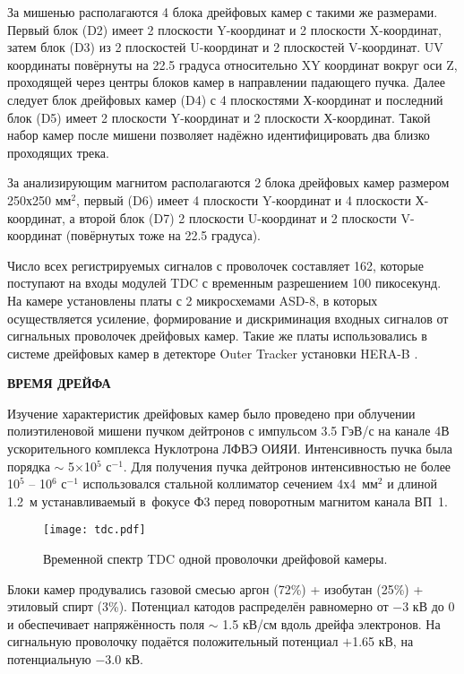 За мишенью располагаются 4 блока дрейфовых камер с такими же размерами. Первый
блок (D2) имеет 2 плоскости Y-координат и 2 плоскости X-координат, затем блок
(D3) из 2 плоскостей U-координат и 2 плоскостей V-координат. UV координаты
повёрнуты на 22.5 градуса относительно XY координат вокруг оси Z, проходящей
через центры блоков камер в направлении падающего пучка. Далее следует блок
дрейфовых камер (D4) с 4 плоскостями Х-координат и последний блок (D5) имеет
2 плоскости Y-координат и 2 плоскости Х-координат. Такой набор камер после
мишени позволяет надёжно идентифицировать два близко проходящих трека.

За анализирующим магнитом располагаются 2 блока дрейфовых камер размером
250х250 мм$^{2}$, первый (D6) имеет 4 плоскости Y-координат и 4 плоскости
Х-координат, а второй блок (D7) 2 плоскости U-координат и 2 плоскости
V-координат (повёрнутых тоже на 22.5 градуса).

Число всех регистрируемых сигналов с проволочек составляет 162, которые
поступают на входы модулей TDC с временным разрешением 100 пикосекунд.
На камере установлены платы
с 2 микросхемами ASD-8, в которых осуществляется усиление, формирование
и дискриминация входных сигналов от сигнальных проволочек дрейфовых камер.
Такие же платы использовались в системе дрейфовых камер в детекторе
Outer Tracker установки HERA-B \cite{hera:web}.

\vspace* {0.5cm}
\begin{center} \bf{ВРЕМЯ ДРЕЙФА} \end{center}

Изучение характеристик дрейфовых камер было проведено при облучении
полиэтиленовой мишени пучком дейтронов с импульсом 3.5 ГэВ/с на канале 4В
ускорительного комплекса Нуклотрона ЛФВЭ ОИЯИ. Интенсивность пучка была порядка
$\sim$ 5$\times$10$^{5}$ с$^{-1}$. Для получения пучка дейтронов интенсивностью
не более 10$^{5}$ -- 10$^{6}$ с$^{-1}$ использовался стальной коллиматор сечением
4х4~мм$^{2}$ и длиной 1.2~м устанавливаемый в~фокусе Ф3 перед поворотным
магнитом канала ВП~1.

\begin{figure}[h]
  \begin{center}
    \texttt{[image: tdc.pdf]}
    \caption {Временной спектр TDC одной проволочки дрейфовой камеры.}
    \label{fig:tdc}
  \end{center}
\end{figure}

Блоки камер продувались газовой смесью аргон (72\%) + изобутан (25\%) +
этиловый спирт (3\%). Потенциал катодов распределён равномерно от $-3$ кВ до 0
и обеспечивает напряжённость поля $\sim$ 1.5 кВ/см вдоль дрейфа электронов.
На сигнальную проволочку подаётся положительный потенциал $+$1.65 кВ,
на потенциальную $-$3.0 кВ.

